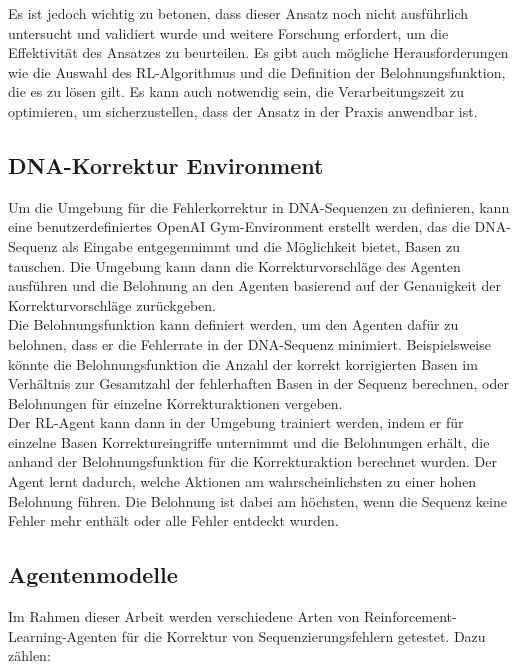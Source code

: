 \documentclass[oneside,bibliography=totocnumbered,BCOR=5mm]{scrbook}%
\theoremstyle{definition}
\theoremstyle{definition}
\theoremstyle{definition}
\theoremstyle{definition}
\theoremstyle{definition}
\theoremstyle{definition}
\begin{document}
Es ist jedoch wichtig zu betonen, dass dieser Ansatz noch nicht ausführlich untersucht und validiert wurde und 
weitere Forschung erfordert, um die Effektivität des Ansatzes zu beurteilen. 
Es gibt auch mögliche Herausforderungen wie die Auswahl des RL-Algorithmus und die Definition der Belohnungsfunktion, 
die es zu lösen gilt. 
Es kann auch notwendig sein, die Verarbeitungszeit zu optimieren, um sicherzustellen, dass der Ansatz in der Praxis anwendbar ist. \\
\linebreak[4]


\subsection{DNA-Korrektur Environment}

Um die Umgebung für die Fehlerkorrektur in DNA-Sequenzen zu definieren, kann eine benutzerdefiniertes OpenAI
Gym-Environment erstellt werden, das die DNA-Sequenz als Eingabe entgegennimmt und die Möglichkeit bietet, 
Basen zu tauschen. 
Die Umgebung kann dann die Korrekturvorschläge des Agenten ausführen und die Belohnung an den Agenten basierend 
auf der Genauigkeit der Korrekturvorschläge zurückgeben. \\


Die Belohnungsfunktion kann definiert werden, um den Agenten dafür zu belohnen, 
dass er die Fehlerrate in der DNA-Sequenz minimiert. 
Beispielsweise könnte die Belohnungsfunktion die Anzahl der korrekt korrigierten Basen im 
Verhältnis zur Gesamtzahl der fehlerhaften Basen in der Sequenz berechnen, oder Belohnungen 
für einzelne Korrekturaktionen vergeben. \\


Der RL-Agent kann dann in der Umgebung trainiert werden, indem er für einzelne Basen Korrektureingriffe unternimmt 
und die Belohnungen erhält, die anhand der Belohnungsfunktion für die Korrekturaktion berechnet wurden. 
Der Agent lernt dadurch, welche Aktionen am wahrscheinlichsten zu einer hohen Belohnung führen.
Die Belohnung ist dabei am höchsten, wenn die Sequenz keine Fehler mehr enthält oder alle Fehler entdeckt wurden. \\
\linebreak[4]

\subsection{Agentenmodelle}

Im Rahmen dieser Arbeit werden verschiedene Arten von Reinforcement-Learning-Agenten
für die Korrektur von Sequenzierungsfehlern getestet. Dazu zählen: \\
\linebreak[4]
\end{document}
